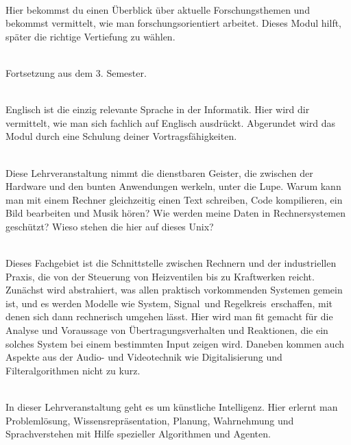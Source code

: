 \textbf{} \\
Hier bekommst du einen Überblick über aktuelle Forschungsthemen und bekommst vermittelt, wie man forschungsorientiert arbeitet.
Dieses Modul hilft, später die richtige Vertiefung zu wählen.

\textbf{} \\
Fortsetzung aus dem 3. Semester.

\textbf{} \\
Englisch ist die einzig relevante Sprache in der Informatik.
Hier wird dir vermittelt, wie man sich fachlich auf Englisch ausdrückt.
Abgerundet wird das Modul durch eine Schulung deiner Vortragsfähigkeiten.



\textbf{} \\
Diese Lehrveranstaltung nimmt die dienstbaren Geister, die zwischen der Hardware und den bunten Anwendungen werkeln, unter die Lupe.
Warum kann man mit einem Rechner gleichzeitig einen Text schreiben, Code kompilieren, ein Bild bearbeiten und Musik hören?
Wie werden meine Daten in Rechnersystemen geschützt?
Wieso stehen die hier auf dieses Unix?

\textbf{} \\
Dieses Fachgebiet ist die Schnittstelle zwischen Rechnern und der industriellen Praxis, die von der Steuerung von Heizventilen bis zu Kraftwerken reicht.
Zunächst wird abstrahiert, was allen praktisch vorkommenden Systemen gemein ist, und es werden Modelle wie \glqq System\grqq, \glqq Signal\grqq\ und \glqq Regelkreis\grqq\ erschaffen, mit denen sich dann rechnerisch umgehen lässt.
Hier wird man fit gemacht für die Analyse und Voraussage von Übertragungsverhalten und Reaktionen, die ein solches System bei einem bestimmten Input zeigen wird.
Daneben kommen auch Aspekte aus der Audio- und Videotechnik wie Digitalisierung und Filteralgorithmen nicht zu kurz.

\textbf{} \\
In dieser Lehrveranstaltung geht es um künstliche Intelligenz.
Hier erlernt man Problemlösung, Wissensrepräsentation, Planung, Wahrnehmung und Sprachverstehen mit Hilfe spezieller Algorithmen und Agenten.

